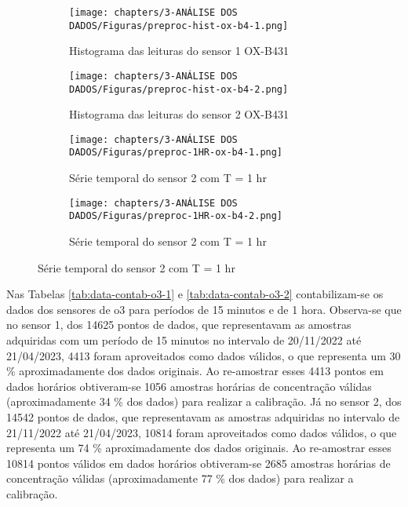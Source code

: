 \begin{figure}[h]
    \centering
    \caption{Histogramas e séries temporais horárias das leituras dos sensores OX-B431}
    \begin{subfigure}{0.4\textwidth}
        \texttt{[image: chapters/3-ANÁLISE DOS DADOS/Figuras/preproc-hist-ox-b4-1.png]}
        \caption{Histograma das leituras do sensor 1 OX-B431}
        \label{fig:data-o3-1-preproc-hist}
    \end{subfigure}
    \hfill
    \begin{subfigure}{0.4\textwidth}
        \texttt{[image: chapters/3-ANÁLISE DOS DADOS/Figuras/preproc-hist-ox-b4-2.png]}
        \caption{Histograma das leituras do sensor 2 OX-B431}
        \label{fig:data-o3-2-preproc-hist}
    \end{subfigure}
    \hfill
    \begin{subfigure}{0.4\textwidth}
        \texttt{[image: chapters/3-ANÁLISE DOS DADOS/Figuras/preproc-1HR-ox-b4-1.png]}
        \caption{Série temporal do sensor 2 com T = 1 hr}
        \label{fig:data-o3-1-preproc-1HR}
    \end{subfigure}
    \hfill
    \begin{subfigure}{0.4\textwidth}
        \texttt{[image: chapters/3-ANÁLISE DOS DADOS/Figuras/preproc-1HR-ox-b4-2.png]}
        \caption{Série temporal do sensor 2 com T = 1 hr}
        \label{fig:data-o3-2-preproc-1HR}
    \end{subfigure}
\end{figure}

Nas Tabelas \ref{tab:data-contab-o3-1} e \ref{tab:data-contab-o3-2} contabilizam-se os dados dos sensores de \acrshort{o3} para períodos de 15 minutos e de 1 hora. Observa-se que no sensor 1, dos 14625 pontos de dados, que representavam as amostras adquiridas com um período de 15 minutos no intervalo de 20/11/2022 até 21/04/2023, 4413 foram aproveitados como dados válidos, o que representa um 30 \% aproximadamente dos dados originais. Ao re-amostrar esses 4413 pontos em dados horários obtiveram-se 1056 amostras horárias de concentração válidas (aproximadamente 34 \% dos dados) para realizar a calibração. Já no sensor 2, dos 14542 pontos de dados, que representavam as amostras adquiridas no intervalo de 21/11/2022 até 21/04/2023, 10814 foram aproveitados como dados válidos, o que representa um 74 \% aproximadamente dos dados originais. Ao re-amostrar esses 10814 pontos válidos em dados horários obtiveram-se 2685 amostras horárias de concentração válidas (aproximadamente 77 \% dos dados) para realizar a calibração.


